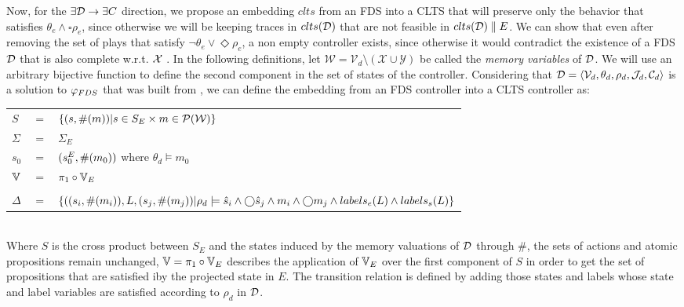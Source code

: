 Now,  for the $\exists \mathcal{D} \rightarrow \exists C$ direction, we propose an embedding $clts$ from an FDS into a CLTS that will preserve only the behavior that satisfies $\theta_e \wedge \square \rho_e$, since otherwise we will be keeping traces in $clts(\mathcal{D})$ that are not feasible in $clts(\mathcal{D})\parallel E$. We can show that even after removing the set of plays that satisfy $\neg \theta_e \vee \Diamond \rho_e$, a non empty controller exists, since otherwise it would contradict the existence of a FDS $\mathcal{D}$ that is also complete w.r.t. ${\mathcal{X}}$ . In the following definitions, let $\mathcal{W}= \mathcal{V}_d\setminus (\mathcal{X} \cup \mathcal{Y})$ be called the \emph{memory variables} of $\mathcal{D}$. We will use an arbitrary bijective function \enumSetDef to define the second component in the set of states of the controller. Considering that  $\mathcal{D}= \langle \mathcal{V}_d, \theta_d, \rho_d, \mathcal{J}_d, \mathcal{C}_d\rangle$ is a solution to $\varphi_{FDS}$ that was built from \controlProblemDef,  we can define the embedding from an FDS controller \fdsD into a CLTS controller \cltsEmbeddingDef{\fdsD}  as:

\vspace{1em}
\begin{tabular}{ l c l }
	$S$ &$=$& $\{(s,\#(m)) | s \in S_E \times m \in \mathcal{P}(\mathcal{W}) \}$\\
	$\Sigma$ &$=$&$\Sigma_E$\\	
	$s_0$&$=$&$(s_0^{E}, \#(m_0))$ where $\theta_d \models m_0$ \\
	$\mathbb{V}$&$=$&$\pi_1 \circ \mathbb{V}_E$\\
	&&\\
	$\Delta$&$=$&$\{((s_i,\#(m_i)),L,(s_j,\#(m_j))| \rho_d \models \hat{s}_{i} \wedge \bigcirc \hat{s}_{j} \wedge m_i \wedge \bigcirc m_j \wedge labels_e(L) \wedge labels_s(L) \}$\\
\end{tabular}
\vspace{1em}
\\
Where $S$ is the cross product between $S_E$ and the states induced by the memory valuations of $\mathcal{D}$ through $\#$, the sets of actions and atomic propositions remain unchanged, $\mathbb{V}=\pi_1 \circ \mathbb{V}_E$ describes the application of $\mathbb{V}_E$ over the first component of $S$ in order to get the set of propositions that are satisfied iby the projected state in $E$. The transition relation is defined by adding those states and labels whose state and label variables are satisfied according to $\rho_d$ in $\mathcal{D}$.

